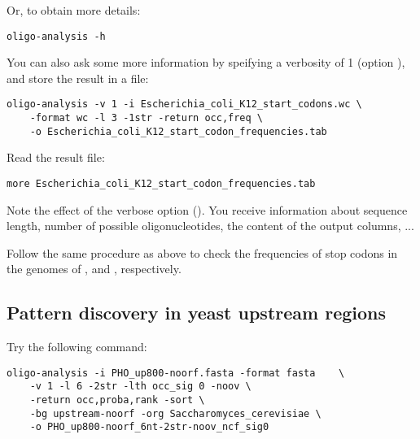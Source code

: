 Or, to obtain more details:
{\color{Blue} \begin{footnotesize} 
\begin{verbatim}
oligo-analysis -h
\end{verbatim} \end{footnotesize}
}

You can also ask some more information by speifying a verbosity of 1
(option ), and store the result in a file:

{\color{Blue} \begin{footnotesize} 
\begin{verbatim}
oligo-analysis -v 1 -i Escherichia_coli_K12_start_codons.wc \
    -format wc -l 3 -1str -return occ,freq \
    -o Escherichia_coli_K12_start_codon_frequencies.tab
\end{verbatim} \end{footnotesize}
}

Read the result file:

{\color{Blue} \begin{footnotesize} 
\begin{verbatim}
more Escherichia_coli_K12_start_codon_frequencies.tab
\end{verbatim} \end{footnotesize}
}


Note the effect of the verbose option (). You receive
information about sequence length, number of possible
oligonucleotides, the content of the output columns, ...


\begin{exercise}
  Follow the same procedure as above to check the frequencies of stop
  codons in the genomes of , and
  \org{Saccharomyces cerevisia}, respectively.
\end{exercise}

\subsection{Pattern discovery in yeast upstream regions}

Try the following command:

{\color{Blue} \begin{footnotesize} 
\begin{verbatim} 
oligo-analysis -i PHO_up800-noorf.fasta -format fasta    \
    -v 1 -l 6 -2str -lth occ_sig 0 -noov \
    -return occ,proba,rank -sort \
    -bg upstream-noorf -org Saccharomyces_cerevisiae \
    -o PHO_up800-noorf_6nt-2str-noov_ncf_sig0 
\end{verbatim} \end{footnotesize}
}


